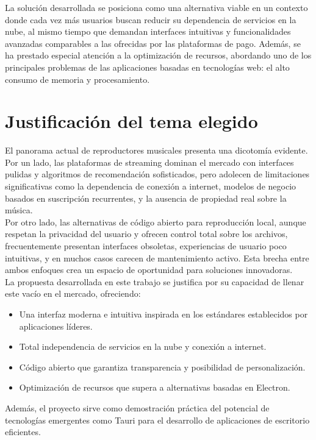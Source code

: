 \documentclass[11pt, a4paper]{article}
\begin{document}
La solución desarrollada se posiciona como una alternativa viable en un contexto donde cada vez más usuarios buscan reducir su dependencia de servicios en la nube, al mismo tiempo que demandan interfaces intuitivas y funcionalidades avanzadas comparables a las ofrecidas por las plataformas de pago. Además, se ha prestado especial atención a la optimización de recursos, abordando uno de los principales problemas de las aplicaciones basadas en tecnologías web: el alto consumo de memoria y procesamiento. \\


\section{Justificación del tema elegido}

El panorama actual de reproductores musicales presenta una dicotomía evidente. Por un lado, las plataformas de streaming dominan el mercado con interfaces pulidas y algoritmos de recomendación sofisticados, pero adolecen de limitaciones significativas como la dependencia de conexión a internet, modelos de negocio basados en suscripción recurrentes, y la ausencia de propiedad real sobre la música. \\

Por otro lado, las alternativas de código abierto para reproducción local, aunque respetan la privacidad del usuario y ofrecen control total sobre los archivos, frecuentemente presentan interfaces obsoletas, experiencias de usuario poco intuitivas, y en muchos casos carecen de mantenimiento activo. Esta brecha entre ambos enfoques crea un espacio de oportunidad para soluciones innovadoras. \\

La propuesta desarrollada en este trabajo se justifica por su capacidad de llenar este vacío en el mercado, ofreciendo:
\begin{itemize}
    \item Una interfaz moderna e intuitiva inspirada en los estándares establecidos por aplicaciones líderes.
    \item Total independencia de servicios en la nube y conexión a internet.
    \item Código abierto que garantiza transparencia y posibilidad de personalización.
    \item Optimización de recursos que supera a alternativas basadas en Electron.
\end{itemize}

Además, el proyecto sirve como demostración práctica del potencial de tecnologías emergentes como Tauri para el desarrollo de aplicaciones de escritorio eficientes.
\end{document}
